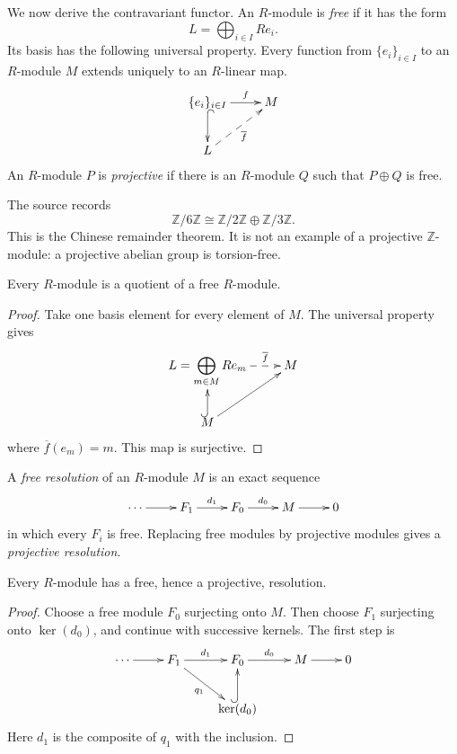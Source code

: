 \noindent
We now derive the contravariant functor.
An $R$-module is {\it free} if it has the
form
$$
L=\bigoplus_{i\in I}R e_i.
$$
Its basis has the following universal
property.  Every function from
$\{e_i\}_{i\in I}$ to an $R$-module $M$
extends uniquely to an $R$-linear map.
$$
\xymatrix{
\{e_i\}_{i\in I}
  \ar[r]^-f
  \ar@{^{(}->}[d]
  & M \\
L \ar@{-->}[ur]_-{\overline f}
}
$$
An $R$-module $P$ is {\it projective} if
there is an $R$-module $Q$ such that
$P\oplus Q$ is free.

\begin{example}
\label{at-example-chinese-remainder-six}
The source records
$$
\mathbb{Z}/6\mathbb{Z}
\cong
\mathbb{Z}/2\mathbb{Z}
\oplus
\mathbb{Z}/3\mathbb{Z}.
$$
This is the Chinese remainder theorem.  It
is not an example of a projective
$\mathbb{Z}$-module: a projective abelian
group is torsion-free.
\end{example}

\begin{proposition}
\label{at-proposition-module-free-quotient}
Every $R$-module is a quotient of a free
$R$-module.
\end{proposition}

\begin{proof}
Take one basis element for every element of
$M$.  The universal property gives
$$
\xymatrix{
L=\displaystyle\bigoplus_{m\in M}R e_m
  \ar@{-->}[r]^-{\overline f}
  & M \\
M \ar@{^{(}->}[u]
  \ar[ur]
}
$$
where $\overline f(e_m)=m$.  This map is
surjective.
\end{proof}

\begin{definition}
\label{at-definition-projective-resolution}
A {\it free resolution} of an $R$-module
$M$ is an exact sequence
$$
\xymatrix{
\cdots \ar[r]
  & F_1 \ar[r]^-{d_1}
  & F_0 \ar[r]^-{d_0}
  & M \ar[r]
  & 0
}
$$
in which every $F_i$ is free.  Replacing
free modules by projective modules gives a
{\it projective resolution}.
\end{definition}

\begin{theorem}
\label{at-theorem-projective-resolutions}
Every $R$-module has a free, hence a
projective, resolution.
\end{theorem}

\begin{proof}
Choose a free module $F_0$ surjecting onto
$M$.  Then choose $F_1$ surjecting onto
$\ker(d_0)$, and continue with successive
kernels.  The first step is
$$
\xymatrix{
\cdots \ar[r]
  & F_1 \ar[r]^-{d_1}
    \ar[rd]_{q_1}
  & F_0 \ar[r]^-{d_0}
  & M \ar[r]
  & 0 \\
  & & \ker(d_0)
      \ar@{^{(}->}[u].
}
$$
Here $d_1$ is the composite of $q_1$ with
the inclusion.
\end{proof}

